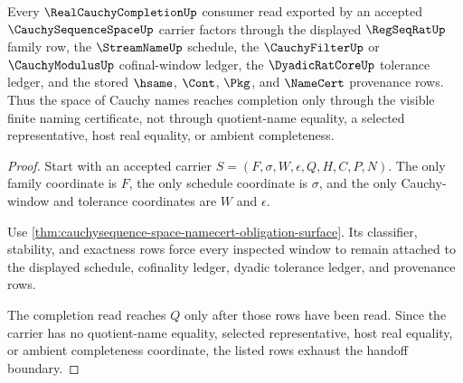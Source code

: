 \begin{theorem}
\label{thm:cauchysequence-space-completion-handoff}
Every $\RealCauchyCompletionUp$ consumer read exported by an accepted $\CauchySequenceSpaceUp$ carrier factors through the displayed $\RegSeqRatUp$ family row, the $\StreamNameUp$ schedule, the $\CauchyFilterUp$ or $\CauchyModulusUp$ cofinal-window ledger, the $\DyadicRatCoreUp$ tolerance ledger, and the stored $\hsame$, $\Cont$, $\Pkg$, and $\NameCert$ provenance rows. Thus the space of Cauchy names reaches completion only through the visible finite naming certificate, not through quotient-name equality, a selected representative, host real equality, or ambient completeness.
\end{theorem}
\begin{proof}
Start with an accepted carrier $S=(F,\sigma,W,\epsilon,Q,H,C,P,N)$. The only family coordinate is $F$, the only schedule coordinate is $\sigma$, and the only Cauchy-window and tolerance coordinates are $W$ and $\epsilon$.

Use \autoref{thm:cauchysequence-space-namecert-obligation-surface}. Its classifier, stability, and exactness rows force every inspected window to remain attached to the displayed schedule, cofinality ledger, dyadic tolerance ledger, and provenance rows.

The completion read reaches $Q$ only after those rows have been read. Since the carrier has no quotient-name equality, selected representative, host real equality, or ambient completeness coordinate, the listed rows exhaust the handoff boundary.
\end{proof}

